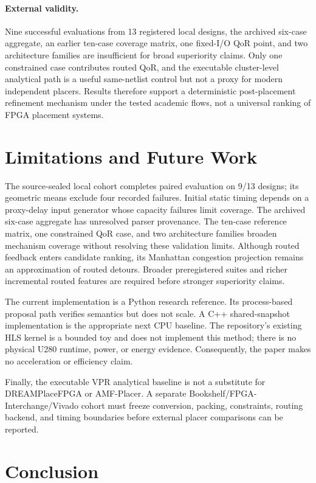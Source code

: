 \documentclass[sigconf,anonymous,review]{acmart}
\newcommand{\vpr}{\textsc{VPR}}
\begin{document}
\paragraph{External validity.}
Nine successful evaluations from 13 registered local designs, the archived
six-case aggregate, an earlier ten-case coverage matrix, one fixed-I/O QoR
point, and two architecture families are insufficient for broad
superiority claims.  Only one constrained case contributes routed QoR, and the executable
cluster-level analytical path is a useful same-netlist control but not a proxy
for modern independent placers.  Results therefore support a deterministic
post-placement refinement mechanism under the tested academic flows, not a
universal ranking of FPGA placement systems.

\section{Limitations and Future Work}

The source-sealed local cohort completes paired evaluation on 9/13 designs;
its geometric means exclude four recorded failures. Initial static timing
depends on a proxy-delay input generator whose capacity failures limit coverage.
The archived six-case aggregate has unresolved parser provenance. The ten-case
reference matrix, one constrained QoR case, and two architecture families
broaden mechanism coverage without resolving these validation limits. Although routed
feedback enters candidate ranking, its Manhattan congestion projection remains
an approximation of routed detours.  Broader preregistered suites and richer
incremental routed features are required before stronger superiority claims.

The current implementation is a Python research reference.  Its process-based
proposal path verifies semantics but does not scale.  A C++ shared-snapshot
implementation is the appropriate next CPU baseline.  The repository's
existing HLS kernel is a bounded toy and does not implement this method; there
is no physical U280 runtime, power, or energy evidence.  Consequently, the
paper makes no acceleration or efficiency claim.

Finally, the executable \vpr{} analytical baseline is not a substitute for
DREAMPlaceFPGA or AMF-Placer.  A separate Bookshelf/FPGA-Interchange/Vivado
cohort must freeze conversion, packing, constraints, routing backend, and
timing boundaries before external placer comparisons can be reported.

\section{Conclusion}
\end{document}
